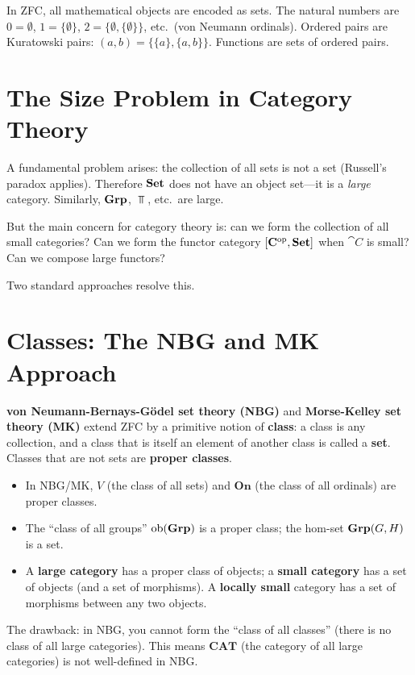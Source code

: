 In ZFC, all mathematical objects are encoded as sets. The natural numbers are $0 = \emptyset$, $1 = \{\emptyset\}$, $2 = \{\emptyset, \{\emptyset\}\}$, etc.\ (von Neumann ordinals). Ordered pairs are Kuratowski pairs: $(a,b) = \{\{a\}, \{a,b\}\}$. Functions are sets of ordered pairs.

\section{The Size Problem in Category Theory}

A fundamental problem arises: the collection of all sets is not a set (Russell's paradox applies). Therefore $\mathbf{Set}$ does not have an object set—it is a \emph{large} category. Similarly, $\mathbf{Grp}$, $\Top$, etc.\ are large.

But the main concern for category theory is: can we form the collection of all small categories? Can we form the functor category $[\mathbf{C}^{\mathrm{op}}, \mathbf{Set}]$ when $\cat{C}$ is small? Can we compose large functors?

Two standard approaches resolve this.

\section{Classes: The NBG and MK Approach}

\textbf{von Neumann-Bernays-Gödel set theory (NBG)} and \textbf{Morse-Kelley set theory (MK)} extend ZFC by a primitive notion of \textbf{class}: a class is any collection, and a class that is itself an element of another class is called a \textbf{set}. Classes that are not sets are \textbf{proper classes}.

\begin{itemize}
  \item In NBG/MK, $V$ (the class of all sets) and $\mathbf{On}$ (the class of all ordinals) are proper classes.
  \item The ``class of all groups'' $\text{ob}(\mathbf{Grp})$ is a proper class; the hom-set $\mathbf{Grp}(G,H)$ is a set.
  \item A \textbf{large category} has a proper class of objects; a \textbf{small category} has a set of objects (and a set of morphisms). A \textbf{locally small} category has a set of morphisms between any two objects.
\end{itemize}

The drawback: in NBG, you cannot form the ``class of all classes'' (there is no class of all large categories). This means $\mathbf{CAT}$ (the category of all large categories) is not well-defined in NBG.

